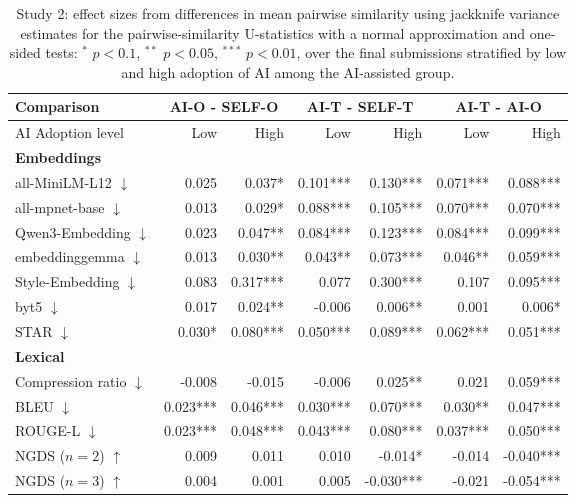 \begin{table}[ht]
\centering
\small
\begin{tabular}{lrr|rr|rr}
\toprule
Comparison & \multicolumn{2}{c}{\textbf{AI-O - SELF-O}} & \multicolumn{2}{c}{\textbf{AI-T - SELF-T}} & \multicolumn{2}{c}{\textbf{AI-T - AI-O}} \\
\midrule
AI Adoption level & Low & High & Low & High & Low & High \\
\cmidrule(lr){2-3} \cmidrule(lr){4-5} \cmidrule(lr){6-7}
\midrule
\rowcolor{lightgray}
\textbf{Embeddings} & & & & & & \\
all-MiniLM-L12 $\downarrow$ & 0.025 & 0.037* & 0.101*** & 0.130*** & 0.071*** & 0.088*** \\
all-mpnet-base $\downarrow$ & 0.013 & 0.029* & 0.088*** & 0.105*** & 0.070*** & 0.070*** \\
Qwen3-Embedding $\downarrow$ & 0.023 & 0.047** & 0.084*** & 0.123*** & 0.084*** & 0.099*** \\
embeddinggemma $\downarrow$ & 0.013 & 0.030** & 0.043** & 0.073*** & 0.046** & 0.059*** \\
Style-Embedding $\downarrow$ & 0.083 & 0.317*** & 0.077 & 0.300*** & 0.107 & 0.095*** \\
byt5 $\downarrow$ & 0.017 & 0.024** & -0.006 & 0.006** & 0.001 & 0.006* \\
STAR $\downarrow$ & 0.030* & 0.080*** & 0.050*** & 0.089*** & 0.062*** & 0.051*** \\
\midrule
\rowcolor{lightgray}
\textbf{Lexical} & & & & & & \\
Compression ratio $\downarrow$ & -0.008 & -0.015 & -0.006 & 0.025** & 0.021 & 0.059*** \\
BLEU $\downarrow$ & 0.023*** & 0.046*** & 0.030*** & 0.070*** & 0.030** & 0.047*** \\
ROUGE-L $\downarrow$ & 0.023*** & 0.048*** & 0.043*** & 0.080*** & 0.037*** & 0.050*** \\
NGDS ($n=2$) $\uparrow$ & 0.009 & 0.011 & 0.010 & -0.014* & -0.014 & -0.040*** \\
NGDS ($n=3$) $\uparrow$ & 0.004 & 0.001 & 0.005 & -0.030*** & -0.021 & -0.054*** \\
\bottomrule
\end{tabular}
\caption{Study 2: effect sizes from differences in mean pairwise similarity using jackknife variance estimates for the pairwise-similarity U-statistics with a normal approximation and one-sided tests: $^{*}$ $p<0.1$, $^{**}$ $p<0.05$, $^{***}$ $p<0.01$, over the final submissions stratified by low and high adoption of AI among the AI-assisted group.}
\label{tab:effects_low_high_study2}
\end{table}
